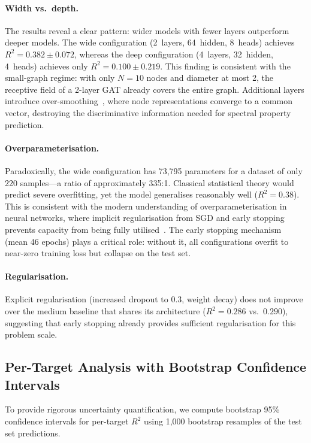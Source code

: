 \paragraph{Width vs.\ depth.}
The results reveal a clear pattern: wider models with fewer layers outperform deeper models. The wide configuration (2~layers, 64~hidden, 8~heads) achieves $R^2 = 0.382 \pm 0.072$, whereas the deep configuration (4~layers, 32~hidden, 4~heads) achieves only $R^2 = 0.100 \pm 0.219$. This finding is consistent with the small-graph regime: with only $N = 10$ nodes and diameter at most 2, the receptive field of a 2-layer GAT already covers the entire graph. Additional layers introduce over-smoothing~\cite{kipf2017semi}, where node representations converge to a common vector, destroying the discriminative information needed for spectral property prediction.

\paragraph{Overparameterisation.}
Paradoxically, the wide configuration has 73,795 parameters for a dataset of only 220 samples---a ratio of approximately 335:1. Classical statistical theory would predict severe overfitting, yet the model generalises reasonably well ($R^2 = 0.38$). This is consistent with the modern understanding of overparameterisation in neural networks, where implicit regularisation from SGD and early stopping prevents capacity from being fully utilised~\cite{goodfellow2016deep}. The early stopping mechanism (mean 46 epochs) plays a critical role: without it, all configurations overfit to near-zero training loss but collapse on the test set.

\paragraph{Regularisation.}
Explicit regularisation (increased dropout to 0.3, weight decay) does not improve over the medium baseline that shares its architecture ($R^2 = 0.286$ vs.\ $0.290$), suggesting that early stopping already provides sufficient regularisation for this problem scale.

\subsection{Per-Target Analysis with Bootstrap Confidence Intervals}

To provide rigorous uncertainty quantification, we compute bootstrap 95\% confidence intervals for per-target $R^2$ using 1,000 bootstrap resamples of the test set predictions.

